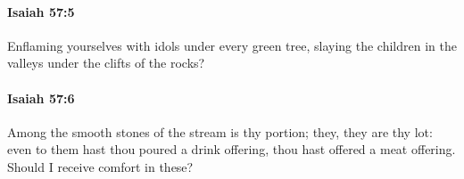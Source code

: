 		\paragraph{Isaiah 57:5} %
			\label{ISAIAH-57-5}

			Enflaming yourselves with idols under every green tree, slaying the children in the valleys under the clifts of the rocks?


		\paragraph{Isaiah 57:6} %
			\label{ISAIAH-57-6}

			Among the smooth stones of the stream is thy portion; they, they are thy lot: even to them hast thou poured a drink offering, thou hast offered a meat offering. Should I receive comfort in these?


